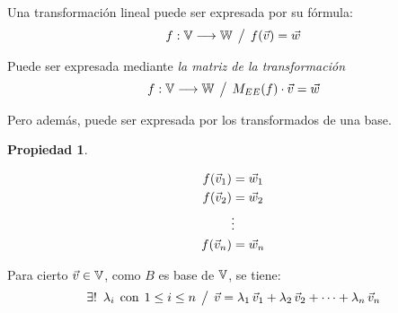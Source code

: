 \documentclass[a5paper,12pt,twoside]{book}
\newtheorem{prop}{{Propiedad}}[chapter]
\begin{document}
Una transformación lineal puede ser expresada por su fórmula:
\begin{equation*}
    f: \mathbb{V} \longrightarrow \mathbb{W} \hspace{1ex} \big/ \hspace{1ex} f(\Vec{v}) = \Vec{w}
\end{equation*}

Puede ser expresada mediante \emph{la matriz de la transformación} 
\begin{equation*}
    f: \mathbb{V} \longrightarrow \mathbb{W} \hspace{1ex} \big/ \hspace{1ex} M_{EE}(f) \cdot \Vec{v} = \Vec{w}
\end{equation*}

Pero además, puede ser expresada por los transformados de una base.

\begin{mdframed}[style=PropertyFrame]
    \begin{prop}
    \end{prop}
    \begin{gather*}
        f(\Vec{v}_1) = \Vec{w}_1
        \\
        f(\Vec{v}_2) = \Vec{w}_2
        \\
        \vdots
        \\
        f(\Vec{v}_n) = \Vec{w}_n
    \end{gather*}
\end{mdframed}


Para cierto $\Vec{v} \in \mathbb{V}$, como $B$ es base de $\mathbb{V}$, se tiene:
\begin{equation*}
    \exists ! \enspace \lambda_i \hspace{1ex} \textrm{con} \hspace{1ex} 1 \leq i \leq n \hspace{1ex} \big/ \hspace{1ex}
    \Vec{v} = \lambda_1 \, \Vec{v}_1 + \lambda_2 \, \Vec{v}_2 + \dots + \lambda_n \, \Vec{v}_n
\end{equation*}
\end{document}
